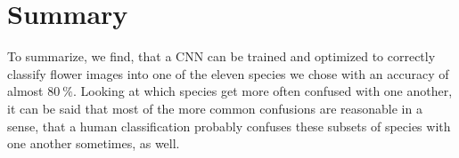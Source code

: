 \section{Summary}
\label{sec:summary}
To summarize, we find, that a CNN can be trained and optimized to correctly classify flower images into one of the eleven species we chose with an accuracy of almost $\SI{80}{\percent}$.
Looking at which species get more often confused with one another, it can be said that most of the more common confusions are reasonable in a sense, that a human classification 
probably confuses these subsets of species with one another sometimes, as well.
